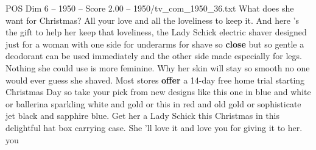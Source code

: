 \begin{textsample}{POS Dim 6 – 1950 – Score 2.00 – 1950/tv\_com\_1950\_36.txt}  \label{ex:f6_pos_010}
What does she want for Christmas?
All your love and all the loveliness to keep it.
And here 's the gift to help her keep that loveliness, the Lady Schick electric shaver designed just for a woman with one side for underarms for shave so \textbf{close} but so gentle a deodorant can be used immediately and the other side made especially for legs.
Nothing she could use is more feminine.
Why her skin will stay so smooth no one would ever guess she shaved.
Most stores \textbf{offer} a 14-day free home trial starting Christmas Day so take your pick from new designs like this one in blue and white or ballerina sparkling white and gold or this in red and old gold or sophisticate jet black and sapphire blue.
Get her a Lady Schick this Christmas in this delightful hat box carrying case.
She 'll love it and love you for giving it to her. you

\end{textsample}
